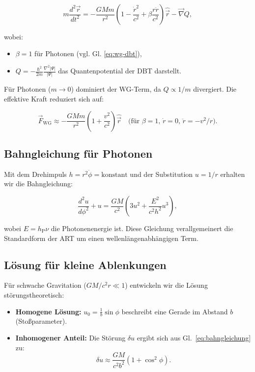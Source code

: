 \begin{equation}
m \frac{d^2 \vec{r}}{dt^2} = -\frac{GMm}{r^2} \left(1 - \frac{\dot{r}^2}{c^2} + \beta \frac{r \ddot{r}}{c^2}\right) \hat{\vec{r}} - \vec{\nabla} Q,
\end{equation}

wobei:
\begin{itemize}
\item $\beta = 1$ für Photonen (vgl. Gl. \ref{eq:wg-dbt}),
\item $Q = -\frac{\hbar^2}{2m} \frac{\nabla^2 |\Psi|}{|\Psi|}$ das Quantenpotential der DBT darstellt.
\end{itemize}

Für Photonen ($m \to 0$) dominiert der WG-Term, da $Q \propto 1/m$ divergiert. Die effektive Kraft reduziert sich auf:

\begin{equation}
\vec{F}_{\text{WG}} \approx -\frac{GMm}{r^2} \left(1 + \frac{v^2}{c^2}\right) \hat{\vec{r}} \quad \text{(für $\beta = 1$, $\dot{r} = 0$, $\ddot{r} = -v^2/r$)}.
\end{equation}

\subsection{Bahngleichung für Photonen}
Mit dem Drehimpuls $h = r^2 \dot{\phi} = \text{konstant}$ und der Substitution $u = 1/r$ erhalten wir die Bahngleichung:

\begin{equation}
\frac{d^2 u}{d\phi^2} + u = \frac{GM}{c^2} \left(3u^2 + \frac{E^2}{c^2 h^2} u^3\right),
\label{eq:bahngleichung}
\end{equation}

wobei $E = h_{\text{P}} \nu$ die Photonenenergie ist. Diese Gleichung verallgemeinert die Standardform der ART um einen wellenlängenabhängigen Term.

\subsection{Lösung für kleine Ablenkungen}
Für schwache Gravitation ($GM/c^2 r \ll 1$) entwickeln wir die Lösung störungstheoretisch:

\begin{itemize}
\item \textbf{Homogene Lösung:} $u_0 = \frac{1}{b} \sin \phi$ beschreibt eine Gerade im Abstand $b$ (Stoßparameter).
\item \textbf{Inhomogener Anteil:} Die Störung $\delta u$ ergibt sich aus Gl.~\ref{eq:bahngleichung} zu:
\begin{equation}
\delta u \approx \frac{GM}{c^2 b^2} (1 + \cos^2 \phi).
\end{equation}
\end{itemize}

